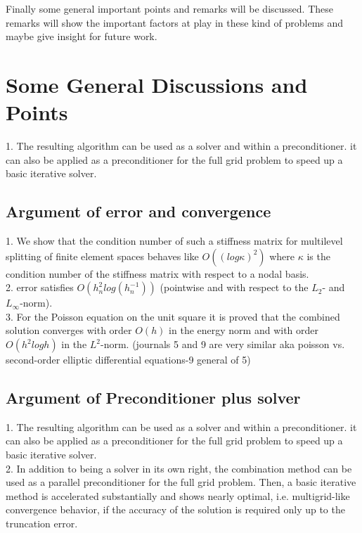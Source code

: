 Finally some general important points and remarks will be discussed. These remarks will show the important factors at play in these kind of problems and maybe give insight for future work.

\section{Some General Discussions and Points}
1. The resulting algorithm can be used as a solver and within a preconditioner. it can also be applied as a preconditioner for the full grid problem to speed up a basic iterative solver. \cite{Griebel1992} \\

\subsection{Argument of error and convergence}
1. We show that the condition number of such a stiffness matrix for multilevel splitting of finite element spaces behaves like $O((log \kappa)^2) $ where $\kappa$ is the condition number of the stiffness matrix with respect to a nodal basis. \cite{Yserentant1986} \\
2. error satisfies $O({h}^2_nlog({h}^{-1}_n))$ (pointwise and with respect to the $L_2$- and $L_\infty$-norm).\cite{Griebel1992b} \\

3. For the Poisson equation on the unit square it is proved that the combined solution converges with order $O(h)$ in the energy norm and with order $O(h^2log h)$ in the $L^2$-norm. (journals 5 and 9 are very similar aka poisson vs. second-order elliptic differential equations-9 general of 5) \cite{Pflaum1993}\\

\subsection{Argument of Preconditioner plus solver}
1. The resulting algorithm can be used as a solver and within a preconditioner. it can also be applied as a preconditioner for the full grid problem to speed up a basic iterative solver. \cite{Griebel1992} \\

2. In addition to being a solver in its own right, the combination method can be used as a parallel preconditioner for the full grid problem. Then, a basic iterative method is accelerated substantially and shows nearly optimal, i.e. multigrid-like convergence behavior, if the accuracy of the solution is required only up to the truncation error.\cite{Griebel1992} \\

